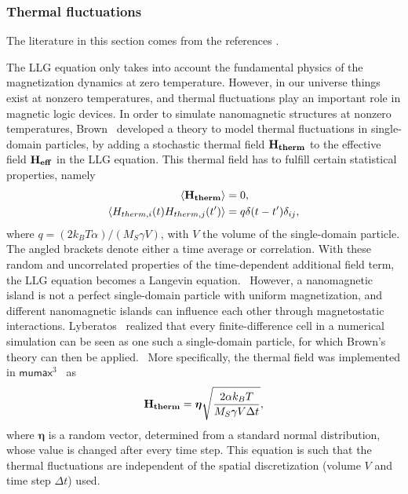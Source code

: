 \documentclass[10pt,a4paper]{article}
\renewcommand{\vec}[1]{\boldsymbol{#1}}
\newcommand{\mumax}{$\mathsf{mumax}^3$}
\begin{document}
\subsubsection{Thermal fluctuations}
The literature in this section comes from the references \cite{LEL-17b}. \par
The LLG equation only takes into account the fundamental physics of the magnetization dynamics at zero temperature. However, in our universe things exist at nonzero temperatures, and thermal fluctuations play an important role in magnetic logic devices. %
In order to simulate nanomagnetic structures at nonzero temperatures, Brown~\cite{ThermFluc_SingleDomain} developed a theory to model thermal fluctuations in single-domain particles, by adding a stochastic thermal field $\vb{H_{therm}}$ to the effective field $\vb{H_{eff}}$ in the LLG equation. This thermal field has to fulfill certain statistical properties, namely
\begin{align*}
    \langle \vb{H_{therm}} \rangle &= 0 \mathrm{,} \\
    \langle H_{therm,i}(t) H_{therm,j}(t') \rangle &= q \delta(t-t') \delta_{ij} \mathrm{,}
\end{align*}
where $q=(2 k_B T \alpha)/(M_S \gamma V)$, with $V$ the volume of the single-domain particle. The angled brackets denote either a time average or correlation. With these random and uncorrelated properties of the time-dependent additional field term, the LLG equation becomes a Langevin equation.~\cite{ThermFluc_SingleDomain} However, a nanomagnetic island is not a perfect single-domain particle with uniform magnetization, and different nanomagnetic islands can influence each other through magnetostatic interactions.
Lyberatos~\cite{Lyberatos_1993} realized that every finite-difference cell in a numerical simulation can be seen as one such a single-domain particle, for which Brown's theory can then be applied.~\cite{phd_leliaert} More specifically, the thermal field was implemented in \mumax{}~\cite{LEL-17b,MuMax3} as
\begin{equation}
    \vb{H_{therm}} = \vec{\eta} \sqrt{\frac{2 \alpha k_B T}{M_S \gamma V \Delta t}} \mathrm{,}
    \label{eq:H_therm}
\end{equation}
where $\vec{\eta}$ is a random vector, determined from a standard normal distribution, whose value is changed after every time step. This equation is such that the thermal fluctuations are independent of the spatial discretization (volume $V$ and time step $\Delta t$) used.
\end{document}
